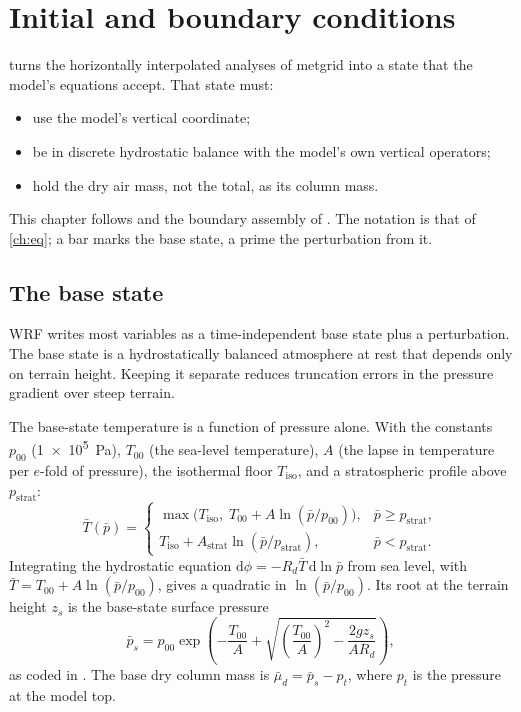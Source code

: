 \chapter{Initial and boundary conditions}\label{ch:icbc}

 turns the horizontally interpolated analyses of metgrid into a state that the model's equations
accept. That state must:
\begin{itemize}
  \item use the model's vertical coordinate;
  \item be in discrete hydrostatic balance with the model's own vertical operators;
  \item hold the dry air mass, not the total, as its column mass.
\end{itemize}
This chapter follows  and the boundary assembly of
. The notation is that of \cref{ch:eq}; a bar marks the base state, a prime the
perturbation from it.

\section{The base state}

WRF writes most variables as a time-independent base state plus a perturbation. The base state is a hydrostatically
balanced atmosphere at rest that depends only on terrain height. Keeping it separate reduces truncation errors in the
pressure gradient over steep terrain.

The base-state temperature is a function of pressure alone. With the constants $p_{00}$ (\SI{1e5}{Pa}), $T_{00}$
(the sea-level temperature), $A$ (the lapse in temperature per $e$-fold of pressure), the isothermal floor
$T_{\mathrm{iso}}$, and a stratospheric profile above $p_{\mathrm{strat}}$:
\begin{equation}
  \bar T(\bar p) =
  \begin{cases}
    \max\bigl(T_{\mathrm{iso}},\; T_{00} + A \ln(\bar p/p_{00})\bigr), & \bar p \ge p_{\mathrm{strat}},\\
    T_{\mathrm{iso}} + A_{\mathrm{strat}} \ln(\bar p/p_{\mathrm{strat}}), & \bar p < p_{\mathrm{strat}}.
  \end{cases}
  \label{eq:base-T}
\end{equation}
Integrating the hydrostatic equation $\mathrm{d}\phi = -R_d \bar T\, \mathrm{d}\ln \bar p$ from sea level, with
$\bar T = T_{00} + A\ln(\bar p/p_{00})$, gives a quadratic in $\ln(\bar p/p_{00})$. Its root at the terrain height
$z_s$ is the base-state surface pressure
\begin{equation}
  \bar p_s = p_{00}\exp\!\left(-\frac{T_{00}}{A} + \sqrt{\left(\frac{T_{00}}{A}\right)^{2} - \frac{2 g z_s}{A R_d}}\right),
  \label{eq:base-ps}
\end{equation}
as coded in . The base dry column mass is
$\bar\mu_d = \bar p_s - p_t$, where $p_t$ is the pressure at the model top.

